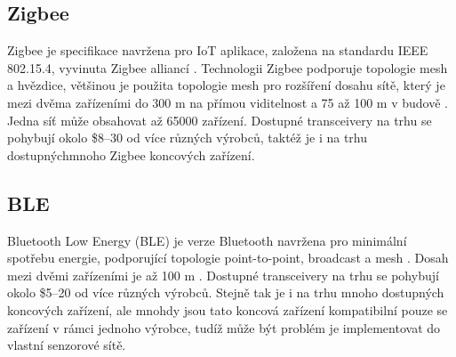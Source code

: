 


\subsection{Zigbee}
Zigbee je specifikace navržena pro IoT aplikace, založena na standardu  IEEE 802.15.4, vyvinuta Zigbee alliancí \cite{Zigbee_alliance}.
Technologii Zigbee podporuje topologie mesh a hvězdice, většinou je použita topologie mesh pro rozšíření dosahu sítě, který je mezi dvěma zařízeními do 300 m na přímou viditelnost a 75 až 100 m v budově \cite{Zigbee_alliance_solution}. Jedna síť může obsahovat až 65000 zařízení.
Dostupné transceivery na trhu se pohybují okolo \$8–30 od více různých výrobců, taktéž je i na trhu dostupnýchmnoho Zigbee koncových zařízení.


\subsection{BLE}
Bluetooth Low Energy (BLE) je verze Bluetooth navržena pro minimální spotřebu energie, podporující topologie point-to-point, broadcast a mesh \cite{BT_alliance}.
Dosah mezi dvěmi zařízeními je až 100 m \cite{BT_nordic}.
Dostupné transceivery na trhu se pohybují okolo \$5–20 od více různých výrobců. Stejně tak je i na trhu mnoho dostupných koncových zařízení, ale mnohdy jsou tato koncová zařízení kompatibilní pouze se zařízení v rámci jednoho výrobce, tudíž může být problém je implementovat do vlastní senzorové sítě. 





